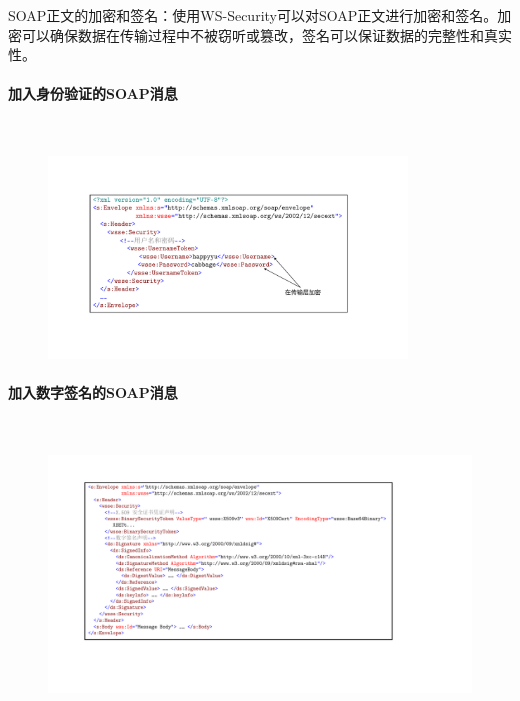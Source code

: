 SOAP正文的加密和签名：使用WS-Security可以对SOAP正文进行加密和签名。加密可以确保数据在传输过程中不被窃听或篡改，签名可以保证数据的完整性和真实性。

\paragraph*{加入身份验证的SOAP消息}~{} \par
\begin{figure}[H]
    \vspace{-0.5em}
	\centering
	\includegraphics[width=0.85\textwidth]{images/加入身份验证的SOAP消息.pdf}
    \vspace{-1.5em}
\end{figure}

\paragraph*{加入数字签名的SOAP消息}~{} \par
\begin{figure}[H]
    \vspace{-0.5em}
	\centering
	\includegraphics[width=\textwidth]{images/加入数字签名的SOAP消息.pdf}
    \vspace{-3em}
\end{figure}


